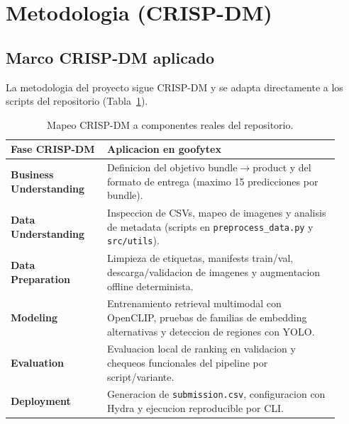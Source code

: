 \section{Metodologia (CRISP-DM)}

\subsection{Marco CRISP-DM aplicado}

La metodologia del proyecto sigue CRISP-DM y se adapta directamente a los scripts del repositorio (Tabla~\ref{tab:crisp-map}).

\begin{table}[h]
  \centering
  \small
  \begin{tabular}{p{0.27\linewidth} p{0.65\linewidth}}
    \toprule
    \textbf{Fase CRISP-DM} & \textbf{Aplicacion en goofytex} \\
    \midrule
    \textbf{Business Understanding} & Definicion del objetivo bundle$\rightarrow$product y del formato de entrega (maximo 15 predicciones por bundle). \\
    \textbf{Data Understanding} & Inspeccion de CSVs, mapeo de imagenes y analisis de metadata (scripts en \texttt{preprocess\_data.py} y \texttt{src/utils}). \\
    \textbf{Data Preparation} & Limpieza de etiquetas, manifests train/val, descarga/validacion de imagenes y augmentacion offline determinista. \\
    \textbf{Modeling} & Entrenamiento retrieval multimodal con OpenCLIP, pruebas de familias de embedding alternativas y deteccion de regiones con YOLO. \\
    \textbf{Evaluation} & Evaluacion local de ranking en validacion y chequeos funcionales del pipeline por script/variante. \\
    \textbf{Deployment} & Generacion de \texttt{submission.csv}, configuracion con Hydra y ejecucion reproducible por CLI. \\
    \bottomrule
  \end{tabular}
  \caption{Mapeo CRISP-DM a componentes reales del repositorio.}
  \label{tab:crisp-map}
\end{table}

